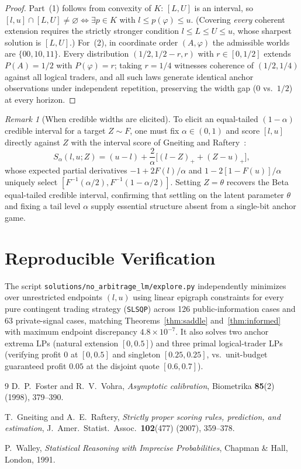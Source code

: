 \documentclass[11pt]{article}
\theoremstyle{plain}
\theoremstyle{definition}
\theoremstyle{remark}
\newtheorem{remark}{Remark}
\begin{document}
\begin{proof}
Part~(1) follows from convexity of $K$: $[L, U]$ is an interval, so $[l, u] \cap [L, U] \neq \varnothing \iff \exists p \in K$ with $l \le p(\varphi) \le u$. (Covering \emph{every} coherent extension requires the strictly stronger condition $l \le L \le U \le u$, whose sharpest solution is $[L, U]$.) For~(2), in coordinate order $(A, \varphi)$ the admissible worlds are $\{00, 10, 11\}$. Every distribution $(1/2, 1/2 - r, r)$ with $r \in [0, 1/2]$ extends $P(A) = 1/2$ with $P(\varphi) = r$; taking $r = 1/4$ witnesses coherence of $(1/2, 1/4)$ against all logical traders, and all such laws generate identical anchor observations under independent repetition, preserving the width gap ($0$ vs.\ $1/2$) at every horizon.
\end{proof}

\begin{remark}[When credible widths are elicited]
To elicit an equal-tailed $(1 - \alpha)$ credible interval for a target $Z \sim F$, one must fix $\alpha \in (0, 1)$ and score $[l, u]$ directly against $Z$ with the interval score of Gneiting and Raftery~\cite[Section~6.2]{gneiting2007}:
\[
S_\alpha(l, u; Z) = (u - l) + \frac{2}{\alpha}\bigl[(l - Z)_+ + (Z - u)_+\bigr],
\]
whose expected partial derivatives $-1 + 2F(l)/\alpha$ and $1 - 2[1 - F(u)]/\alpha$ uniquely select $[F^{-1}(\alpha/2), F^{-1}(1 - \alpha/2)]$. Setting $Z = \theta$ recovers the Beta equal-tailed credible interval, confirming that settling on the latent parameter $\theta$ and fixing a tail level $\alpha$ supply essential structure absent from a single-bit anchor game.
\end{remark}

\section{Reproducible Verification}

The script \texttt{solutions/no\_arbitrage\_lm/explore.py} independently minimizes over unrestricted endpoints $(l, u)$ using linear epigraph constraints for every pure contingent trading strategy (\texttt{SLSQP}) across 126 public-information cases and 63 private-signal cases, matching Theorems~\ref{thm:saddle} and~\ref{thm:informed} with maximum endpoint discrepancy $4.8 \times 10^{-7}$. It also solves two anchor extrema LPs (natural extension $[0, 0.5]$) and three primal logical-trader LPs (verifying profit $0$ at $[0, 0.5]$ and singleton $[0.25, 0.25]$, vs.\ unit-budget guaranteed profit $0.05$ at the disjoint quote $[0.6, 0.7]$).

\begin{thebibliography}{9}
D.~P.~Foster and R.~V.~Vohra, \emph{Asymptotic calibration}, Biometrika \textbf{85}(2) (1998), 379--390.

T.~Gneiting and A.~E.~Raftery, \emph{Strictly proper scoring rules, prediction, and estimation}, J.\ Amer.\ Statist.\ Assoc.\ \textbf{102}(477) (2007), 359--378.

P.~Walley, \emph{Statistical Reasoning with Imprecise Probabilities}, Chapman \& Hall, London, 1991.
\end{thebibliography}
\end{document}

